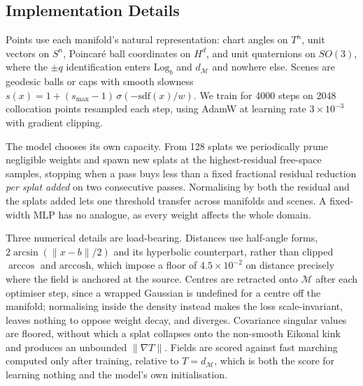 \subsection{Implementation Details}

Points use each manifold's natural representation: chart angles on $T^n$, unit vectors on $S^n$, Poincar\'e ball coordinates on $H^d$, and unit quaternions on $SO(3)$, where the $\pm q$ identification enters $\mathrm{Log}_b$ and $d_\mathcal{M}$ and nowhere else. Scenes are geodesic balls or caps with smooth slowness $s(x) = 1 + (s_{\max}-1)\,\sigma(-\mathrm{sdf}(x)/w)$. We train for 4000 steps on 2048 collocation points resampled each step, using AdamW at learning rate $3\times10^{-3}$ with gradient clipping.

The model chooses its own capacity. From 128 splats we periodically prune negligible weights and spawn new splats at the highest-residual free-space samples, stopping when a pass buys less than a fixed fractional residual reduction \emph{per splat added} on two consecutive passes. Normalising by both the residual and the splats added lets one threshold transfer across manifolds and scenes. A fixed-width \ac{MLP} has no analogue, as every weight affects the whole domain.

Three numerical details are load-bearing. Distances use half-angle forms, $2\arcsin(\|x-b\|/2)$ and its hyperbolic counterpart, rather than clipped $\arccos$ and $\mathrm{arccosh}$, which impose a floor of $4.5\times10^{-2}$ on distance precisely where the field is anchored at the source. Centres are retracted onto $\mathcal{M}$ after each optimiser step, since a wrapped Gaussian is undefined for a centre off the manifold; normalising inside the density instead makes the loss scale-invariant, leaves nothing to oppose weight decay, and diverges. Covariance singular values are floored, without which a splat collapses onto the non-smooth Eikonal kink and produces an unbounded $\|\nabla T\|$. Fields are scored against fast marching computed only after training, relative to $T = d_\mathcal{M}$, which is both the score for learning nothing and the model's own initialisation.
